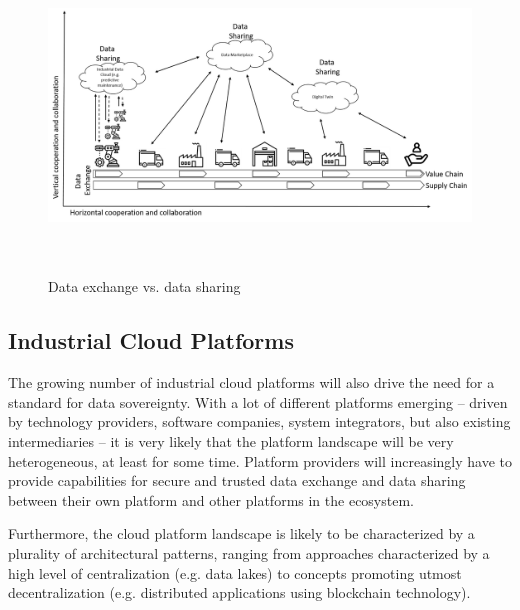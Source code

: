 
\begin{figure}[H]
	\begin{Center}
		\includegraphics[width=6.53in,height=3.29in]{./media/image14.png}
		\caption{Data exchange vs. data sharing}
		\label{fig:dataexchange_vs_sharing}
	\end{Center}
\end{figure}



\subsection{Industrial Cloud Platforms}\label{subsec:industrial_cloud}
The growing number of industrial cloud platforms will also drive the need for a standard for data sovereignty. With a lot of different platforms emerging – driven by technology providers, software companies, system integrators, but also existing intermediaries – it is very likely that the platform landscape will be very heterogeneous, at least for some time. Platform providers will increasingly have to provide capabilities for secure and trusted data exchange and data sharing between their own platform and other platforms in the ecosystem.

Furthermore, the cloud platform landscape is likely to be characterized by a plurality of architectural patterns, ranging from approaches characterized by a high level of centralization (e.g. data lakes) to concepts promoting utmost decentralization (e.g. distributed applications using blockchain technology).

